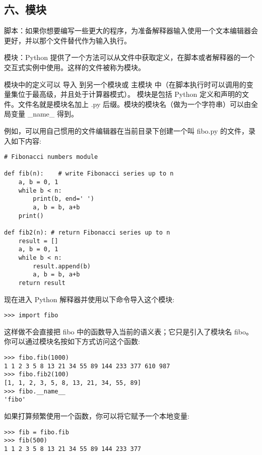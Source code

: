 \documentclass{article}
\begin{document}
\begin{CJK}{UTF8}{gbsn}
\part*{六、模块}
\subparagraph*{}
脚本：如果你想要编写一些更大的程序，为准备解释器输入使用一个文本编辑器会更好，并以那个文件替代作为输入执行。
\subparagraph*{}
模块：Python 提供了一个方法可以从文件中获取定义，在脚本或者解释器的一个交互式实例中使用。这样的文件被称为模块。
\subparagraph*{}
模块中的定义可以 导入 到另一个模块或 主模块 中（在脚本执行时可以调用的变量集位于最高级，并且处于计算器模式）。
模块是包括 Python 定义和声明的文件。文件名就是模块名加上 .py 后缀。模块的模块名（做为一个字符串）可以由全局变量 \_{}name\_{} 得到。
\subparagraph*{}
例如，可以用自己惯用的文件编辑器在当前目录下创建一个叫 fibo.py 的文件，录入如下内容:
\begin{verbatim}
# Fibonacci numbers module

def fib(n):    # write Fibonacci series up to n
    a, b = 0, 1
    while b < n:
        print(b, end=' ')
        a, b = b, a+b
    print()

def fib2(n): # return Fibonacci series up to n
    result = []
    a, b = 0, 1
    while b < n:
        result.append(b)
        a, b = b, a+b
    return result
\end{verbatim}
\subparagraph*{}
现在进入 Python 解释器并使用以下命令导入这个模块:
\begin{verbatim}
>>> import fibo
\end{verbatim}
\subparagraph*{}
这样做不会直接把 fibo 中的函数导入当前的语义表；它只是引入了模块名 fibo。你可以通过模块名按如下方式访问这个函数:
\begin{verbatim}
>>> fibo.fib(1000)
1 1 2 3 5 8 13 21 34 55 89 144 233 377 610 987
>>> fibo.fib2(100)
[1, 1, 2, 3, 5, 8, 13, 21, 34, 55, 89]
>>> fibo.__name__
'fibo'
\end{verbatim}
如果打算频繁使用一个函数，你可以将它赋予一个本地变量:
\begin{verbatim}
>>> fib = fibo.fib
>>> fib(500)
1 1 2 3 5 8 13 21 34 55 89 144 233 377
\end{verbatim}

\end{CJK}
\end{document}
